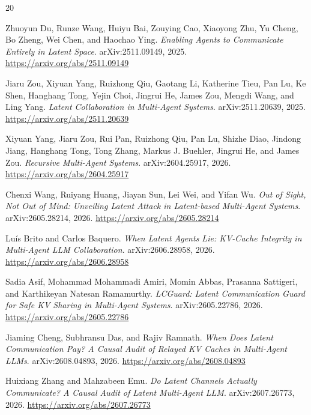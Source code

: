 \documentclass[11pt]{article}
\begin{document}
\begin{thebibliography}{20}

Zhuoyun Du, Runze Wang, Huiyu Bai, Zouying Cao, Xiaoyong Zhu, Yu Cheng,
Bo Zheng, Wei Chen, and Haochao Ying.
\newblock \emph{Enabling Agents to Communicate Entirely in Latent Space}.
\newblock arXiv:2511.09149, 2025.
\newblock \url{https://arxiv.org/abs/2511.09149}

Jiaru Zou, Xiyuan Yang, Ruizhong Qiu, Gaotang Li, Katherine Tieu, Pan Lu,
Ke Shen, Hanghang Tong, Yejin Choi, Jingrui He, James Zou, Mengdi Wang,
and Ling Yang.
\newblock \emph{Latent Collaboration in Multi-Agent Systems}.
\newblock arXiv:2511.20639, 2025.
\newblock \url{https://arxiv.org/abs/2511.20639}

Xiyuan Yang, Jiaru Zou, Rui Pan, Ruizhong Qiu, Pan Lu, Shizhe Diao,
Jindong Jiang, Hanghang Tong, Tong Zhang, Markus J. Buehler, Jingrui He,
and James Zou.
\newblock \emph{Recursive Multi-Agent Systems}.
\newblock arXiv:2604.25917, 2026.
\newblock \url{https://arxiv.org/abs/2604.25917}

Chenxi Wang, Ruiyang Huang, Jiayan Sun, Lei Wei, and Yifan Wu.
\newblock \emph{Out of Sight, Not Out of Mind: Unveiling Latent Attack in
Latent-based Multi-Agent Systems}.
\newblock arXiv:2605.28214, 2026.
\newblock \url{https://arxiv.org/abs/2605.28214}

Lu\'is Brito and Carlos Baquero.
\newblock \emph{When Latent Agents Lie: KV-Cache Integrity in Multi-Agent LLM
Collaboration}.
\newblock arXiv:2606.28958, 2026.
\newblock \url{https://arxiv.org/abs/2606.28958}

Sadia Asif, Mohammad Mohammadi Amiri, Momin Abbas, Prasanna Sattigeri,
and Karthikeyan Natesan Ramamurthy.
\newblock \emph{LCGuard: Latent Communication Guard for Safe KV Sharing in
Multi-Agent Systems}.
\newblock arXiv:2605.22786, 2026.
\newblock \url{https://arxiv.org/abs/2605.22786}

Jiaming Cheng, Subhransu Das, and Rajiv Ramnath.
\newblock \emph{When Does Latent Communication Pay? A Causal Audit of Relayed
KV Caches in Multi-Agent LLMs}.
\newblock arXiv:2608.04893, 2026.
\newblock \url{https://arxiv.org/abs/2608.04893}

Huixiang Zhang and Mahzabeen Emu.
\newblock \emph{Do Latent Channels Actually Communicate? A Causal Audit of
Latent Multi-Agent LLM}.
\newblock arXiv:2607.26773, 2026.
\newblock \url{https://arxiv.org/abs/2607.26773}


\end{thebibliography}
\end{document}
